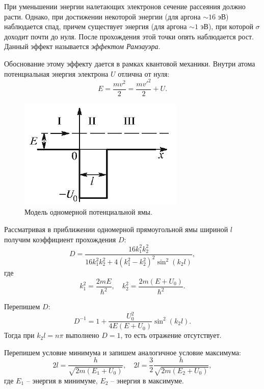 \documentclass[12pt,a4paper]{article}
\begin{document}
	При уменьшении энергии налетающих электронов сечение рассеяния должно расти. Однако, при достижении некоторой энергии (для аргона $\sim 16$ эВ) наблюдается спад, причем существует энергия (для аргона $\sim 1$ эВ), при которой $\sigma$ доходит почти до нуля. После прохождения этой точки опять наблюдается рост. Данный эффект называется \textit{эффектом Рамзауэра}.
	
	Обоснование этому эффекту дается в рамках квантовой механики. Внутри атома потенциальная энергия электрона $U$ отлична от нуля:
	\begin{equation*}
		E = \frac{mv^2}{2} = \frac{mv'^2}{2} + U.
	\end{equation*}
	
	\begin{figure}
		\includegraphics[scale=0.6]{res/pit.png}
		\caption{Модель одномерной потенциальной ямы.}
		\label{fig:pit}
		\vspace{0pt}
	\end{figure}
	
	Рассматривая в приближении одномерной прямоугольной ямы шириной $l$ получим коэффициент прохождения $D$:
	\begin{equation*}
		D = \frac{16 k_1^2 k_2^2}{16 k_1^2 k_2^2 + 4(k_1^2 - k_2^2)^2 \sin^2(k_2 l)},
	\end{equation*}
	где
	\begin{equation}
		k_1^2 = \frac{2mE}{\hbar^2}, \quad k_2^2 = \frac{2m(E+U_0)}{\hbar^2}.
		\label{eq:k}
	\end{equation}
	
	Перепишем $D$:
	\begin{equation}
		D^{-1} = 1 + \frac{U_0^2}{4E (E + U_0)} \sin^2(k_2 l).
	\end{equation}
	Тогда при $k_2 l = n \pi$ выполнено $D = 1$, то есть отражение отсутствует.
	
	Перепишем условие минимума и запишем аналогичное условие максимума:
	\begin{equation}
		2l = \frac{h}{\sqrt{2m (E_1 + U_0)}}, \quad 2l = \frac{3}{2} \frac{h}{\sqrt{2m (E_2 + U_0)}},
		\label{eq:conditions}
	\end{equation}
	где $E_1$ -- энергия в минимуме, $E_2$ -- энергия в максимуме.
	
\end{document}
